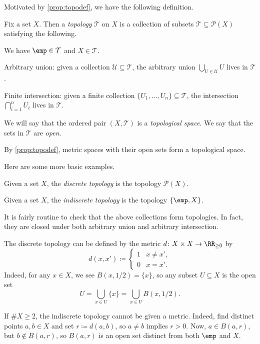 \documentclass[../notes.tex]{subfiles}
\begin{document}
Motivated by \autoref{prop:topodef}, we have the following definition.
\begin{definition}[Topology]
	Fix a set $X$. Then a \textit{topology} $\mathcal T$ on $X$ is a collection of subsets $\mathcal T\subseteq\mathcal P(X)$ satisfying the following.
	\begin{listalph}
		\item We have $\emp\in\mathcal T$ and $X\in\mathcal T$.
		\item Arbitrary union: given a collection $\mathcal U\subseteq\mathcal T$, the arbitrary union $\bigcup_{U\in\mathcal U}U$ lives in $\mathcal T$.
		\item Finite intersection: given a finite collection $\{U_1,\ldots,U_n\}\subseteq\mathcal T$, the intersection $\bigcap_{i=1}^nU_i$ lives in $\mathcal T$.
	\end{listalph}
	We will say that the ordered pair $(X,\mathcal T)$ is a \textit{topological space}. We say that the sets in $\mathcal T$ are \textit{open}.
\end{definition}
\begin{example}
	By \autoref{prop:topodef}, metric spaces with their open sets form a topological space.
\end{example}
Here are some more basic examples.
\begin{defihelper} 
	Given a set $X$, the \textit{discrete topology} is the topology $\mathcal P(X)$.
\end{defihelper}
\begin{defihelper} 
	Given a set $X$, the \textit{indiscrete topology} is the topology $\{\emp,X\}$.
\end{defihelper}
It is fairly routine to check that the above collections form topologies. In fact, they are closed under both arbitrary union and arbitrary intersection.
\begin{remark}
	The discrete topology can be defined by the metric $d\colon X\times X\to\RR_{\ge0}$ by
	\[d(x,x')\coloneqq\begin{cases}
		1 & x\ne x', \\
		0 & x=x'.
	\end{cases}\]
	Indeed, for any $x\in X$, we see $B(x,1/2)=\{x\}$, so any subset $U\subseteq X$ is the open set
	\[U=\bigcup_{x\in U}\{x\}=\bigcup_{x\in U}B(x,1/2).\]
\end{remark}
\begin{remark}
	If $\#X\ge2$, the indiscrete topology cannot be given a metric. Indeed, find distinct points $a,b\in X$ and set $r\coloneqq d(a,b)$, so $a\ne b$ implies $r>0$. Now, $a\in B(a,r)$, but $b\notin B(a,r)$, so $B(a,r)$ is an open set distinct from both $\emp$ and $X$.
\end{remark}
\end{document}
